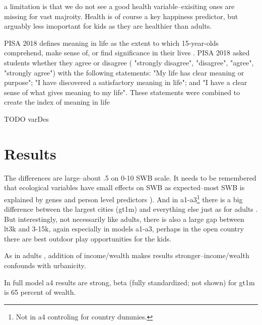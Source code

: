 \documentclass[10pt, letterpaper]{article}
\begin{document}
\begin{spacing}{1.4}
a limitation is that we do not see a good health variable--exisiting ones are
missing for vast majroity. Health is of course a key happiness predictor, but
arguably less imoportant for kids as they are healthier than adults. 


PISA 2018 defines meaning in life as the extent to which 15-year-olds
comprehend, make sense of, or find significance in their lives
\citep{pisa18}. PISA 2018 asked students whether they agree or disagree (
"strongly disagree", "disagree", "agree", "strongly agree") with the following
statements: "My life has clear meaning or purpose"; "I have discovered a
satisfactory meaning in life"; and "I have a clear sense of what gives meaning
to my life". These statements were combined to create the index of meaning in
life



TODO varDes

\section{Results}



The differences are large--about .5 on 0-10 SWB scale. It needs to be remembered
that ecological variables have small effects on SWB as
 expected--most SWB is explained by genes \citep{schnittker08} and person level
 predictors \citep{veenhoven14b}). %
 And in a1-a3\footnote{Not
in a4 controling for country dummies.} there is a big
difference between the largest cities (gt1m) and everything else just as for
adults \citep{aok-ls_fisher16}. But interestingly, not necessarily like adults,
there is also a large gap between lt3k and 3-15k, again especially in models
a1-a3, perhaps in the open country there are best outdoor play opportunities for
the kids.

As in adults \citep{aok21}, addition of income/wealth makes results
stronger--income/wealth confounds with urbanicity.

In full model a4 results are strong, beta (fully standardized; not shown) for
gt1m is 65 percent of wealth.


\end{spacing}
\end{document}
